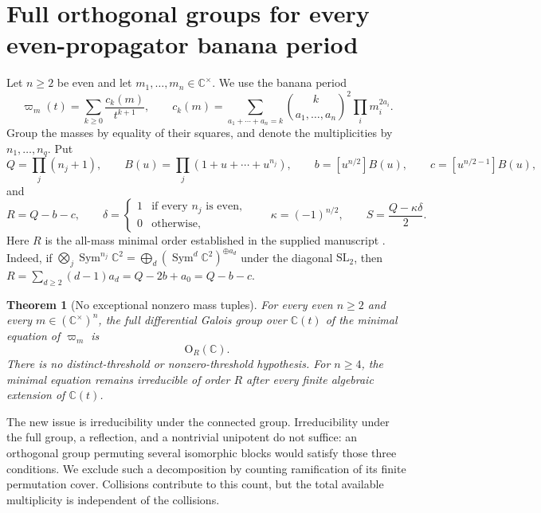 \documentclass[11pt,a4paper]{article}
\newtheorem{theorem}{Theorem}[section]
\theoremstyle{definition}
\theoremstyle{remark}
\numberwithin{equation}{section}
\begin{document}
\clearpage

\section{Full orthogonal groups for every even-propagator banana period}
\label{p7:be:sec}

Let $n\geq2$ be even and let $m_1,\ldots,m_n\in\mathbb C^\times$.
We use the banana period
\[
 \varpi_m(t)=\sum_{k\geq0}\frac{c_k(m)}{t^{k+1}},\qquad
 c_k(m)=\sum_{a_1+\cdots+a_n=k}
       \binom{k}{a_1,\ldots,a_n}^{\!2}\prod_i m_i^{2a_i}.
\]
Group the masses by equality of their squares, and denote the
multiplicities by $n_1,\ldots,n_q$. Put
\[
 Q=\prod_j(n_j+1),\qquad
 B(u)=\prod_j(1+u+\cdots+u^{n_j}),\qquad
 b=[u^{n/2}]B(u),\qquad c=[u^{n/2-1}]B(u),
\]
and
\begin{equation}\label{p7:be:rank-data}
 R=Q-b-c,\qquad
 \delta=\begin{cases}1&\text{if every $n_j$ is even},\\0&\text{otherwise},\end{cases}
 \qquad \kappa=(-1)^{n/2},\qquad
 S=\frac{Q-\kappa\delta}{2}.
\end{equation}
Here $R$ is the all-mass minimal order established in the supplied
manuscript \cite{p5:Keio032}.  Indeed, if
$\bigotimes_j\operatorname{Sym}^{n_j}\mathbb C^2
=\bigoplus_d(\operatorname{Sym}^d\mathbb C^2)^{\oplus a_d}$
under the diagonal $\mathrm{SL}_2$, then
$R=\sum_{d\geq2}(d-1)a_d=Q-2b+a_0=Q-b-c$.

\begin{theorem}[No exceptional nonzero mass tuples]\label{p7:be:main}
For every even $n\geq2$ and every
$m\in(\mathbb C^\times)^n$, the full differential Galois group
over $\mathbb C(t)$ of the minimal equation of $\varpi_m$ is
\[
                         \mathrm O_R(\mathbb C).
\]
There is no distinct-threshold or nonzero-threshold hypothesis.
For $n\geq4$, the minimal equation remains irreducible of order
$R$ after every finite algebraic extension of $\mathbb C(t)$.
\end{theorem}

The new issue is irreducibility under the connected group.
Irreducibility under the full group, a reflection, and a nontrivial
unipotent do not suffice: an orthogonal group permuting several
isomorphic blocks would satisfy those three conditions.
We exclude such a decomposition by counting ramification of its
finite permutation cover.  Collisions contribute to this count,
but the total available multiplicity is independent of the collisions.
\end{document}
